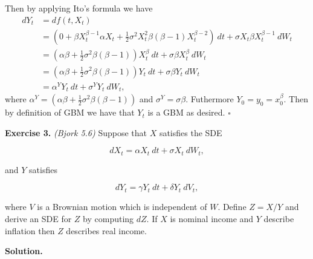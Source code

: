 \documentclass[a4paper,12pt,openany]{book}
\begin{document}
Then by applying Ito's formula we have
\begin{align*}
dY_t&=df(t,X_t)\\
&=\left(0 + \beta X_t^{\beta -1}\alpha X_t+\frac{1}{2}\sigma ^2X_t^2\beta (\beta -1) X_t^{\beta -2}\right)\ dt+\sigma X_t\beta X_t^{\beta -1} \ dW_t\\
&=\left(\alpha \beta+\frac{1}{2}\sigma ^2\beta (\beta -1)\right) X_t^{\beta}\ dt+\sigma \beta X_t^{\beta } \ dW_t\\
&=\left(\alpha \beta+\frac{1}{2}\sigma ^2\beta (\beta -1)\right) Y_t\ dt+\sigma \beta Y_t \ dW_t\\
&= \alpha^Y Y_t\ dt + \sigma^Y Y_t\ dW_t,
\end{align*}
where \(\alpha^Y=\left(\alpha \beta+\frac{1}{2}\sigma ^2\beta (\beta -1)\right)\) and \(\sigma^Y =\sigma \beta\). Futhermore \(Y_0=y_0=x_0^\beta\). Then by definition of GBM we have that \(Y_t\) is a GBM as desired. \(\square\)

\textbf{Exercise 3.} \emph{(Bjork 5.6)} Suppose that \(X\) satisfies the SDE

\[
dX_t = \alpha X_t\ dt + \sigma X_t\ dW_t,
\]

and \(Y\) satisfies

\[
dY_t = \gamma Y_t\ dt+\delta Y_t\ dV_t,
\]

where \(V\) is a Brownian motion which is independent of \(W\). Define \(Z=X/Y\) and derive an SDE for \(Z\) by computing \(dZ\). If \(X\) is nominal income and \(Y\) describe inflation then \(Z\) describes real income.

\textbf{Solution.}
\end{document}
